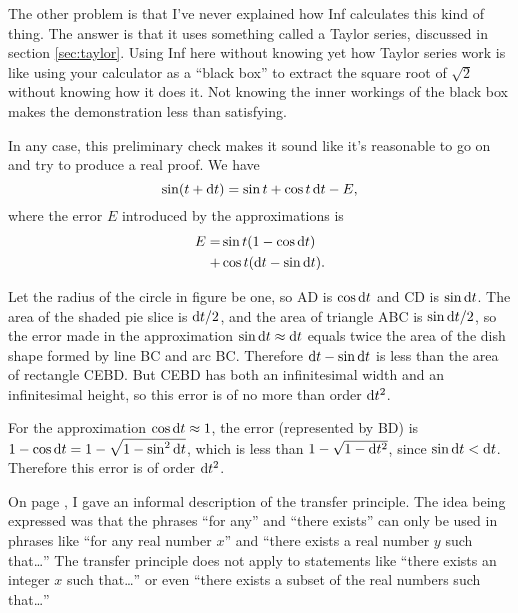 The other problem is that I've never explained how Inf calculates this kind of thing.
The answer is that it uses something called
a Taylor series, discussed in section \ref{sec:taylor}. Using Inf here without knowing yet how Taylor series
work is like using your calculator as a ``black box'' to extract the square root of $\sqrt{2}$ without knowing how
it does it. Not knowing the inner workings of the black box makes the demonstration less than satisfying.

In any case, this preliminary check makes it sound like it's reasonable to go on and try to produce a
real proof. We have
\begin{equation*}
  \sin(t+\operatorname{d\!} t) = \sin t + \cos t \operatorname{d\!} t - E,
\end{equation*}
where the error $E$ introduced by the approximations is
\begin{align*}
  E = &\sin t (1-\cos \operatorname{d\!} t) \\
    + &\cos t (\operatorname{d\!} t - \sin \operatorname{d\!} t).
\end{align*}

Let the radius of the circle in figure  be one, so AD
is $\cos \operatorname{d\!} t$ and CD is $\sin \operatorname{d\!} t$. The area of the shaded pie slice
is $\operatorname{d\!} t/2$, and the area of triangle ABC is $\sin\operatorname{d\!} t/2$, so the
error made in the approximation $\sin\operatorname{d\!} t\approx\operatorname{d\!} t$ equals twice
the area of the dish shape formed by line BC and arc BC. Therefore
$\operatorname{d\!} t-\sin\operatorname{d\!} t$ is less than the area of rectangle CEBD.
But CEBD has both an infinitesimal width and an infinitesimal height,
so this error is of no more than order $\operatorname{d\!} t^2$.

For the approximation $\cos\operatorname{d\!} t\approx 1$, the error (represented
by BD) is $1-\cos\operatorname{d\!} t=1-\sqrt{1-\sin^2\operatorname{d\!} t}$, which is less
than $1-\sqrt{1-\operatorname{d\!} t^2}$, since $\sin \operatorname{d\!} t<\operatorname{d\!} t$. Therefore
this error is of order $\operatorname{d\!} t^2$.

\label{transfer}
On page \pageref{backref-transfer}, I gave an informal description of the transfer principle.
The idea being expressed was that the phrases ``for any'' and
``there exists'' can only be used in phrases like ``for any real number $x$'' and ``there exists
a real number $y$ such that\ldots'' The transfer principle does not apply to statements like ``there exists
an integer $x$ such that\ldots'' or even ``there exists a subset of the real numbers such that\ldots''

